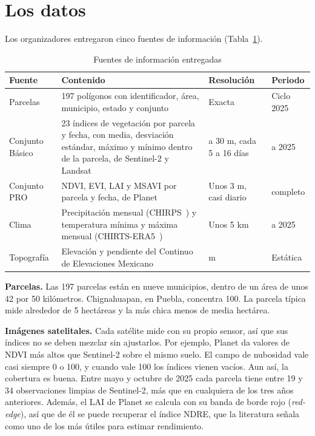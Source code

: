 \section{Los datos}\label{sec:datos}
Los organizadores entregaron cinco fuentes de información (Tabla~\ref{tab:fuentes}).

\begin{table}[!t]
\caption{Fuentes de información entregadas}\label{tab:fuentes}
\centering\footnotesize
\begin{tabularx}{\textwidth}{@{}>{\raggedright\arraybackslash}p{3.2cm}X>{\raggedright\arraybackslash}p{2.6cm}>{\raggedright\arraybackslash}p{2.4cm}@{}}
\toprule
Fuente & Contenido & Resolución & Periodo \\
\midrule
Parcelas & 197 polígonos con identificador, área, municipio, estado y conjunto & Exacta & Ciclo 2025 \\
Conjunto Básico & 23 índices de vegetación por parcela y fecha, con media, desviación estándar, máximo y mínimo dentro de la parcela, de Sentinel-2 y Landsat & 10 a 30 m, cada 5 a 16 días & 2022 a 2025 \\
Conjunto PRO & NDVI, EVI, LAI y MSAVI por parcela y fecha, de Planet & Unos 3 m, casi diario & 2025 completo \\
Clima & Precipitación mensual (CHIRPS~\cite{funk2015}) y temperatura mínima y máxima mensual (CHIRTS-ERA5~\cite{chirts}) & Unos 5 km & 2022 a 2025 \\
Topografía & Elevación y pendiente del Continuo de Elevaciones Mexicano~\cite{inegi} & 120 m & Estática \\
\bottomrule
\end{tabularx}
\end{table}

\textbf{Parcelas.} Las 197 parcelas están en nueve municipios, dentro de un área de unos 42 por 50 kilómetros.
Chignahuapan, en Puebla, concentra 100. La parcela típica mide alrededor de 5 hectáreas y la más chica menos de
media hectárea.

\textbf{Imágenes satelitales.} Cada satélite mide con su propio sensor, así que sus índices no se deben mezclar sin
ajustarlos. Por ejemplo, Planet da valores de NDVI más altos que Sentinel-2 sobre el mismo suelo. El campo de
nubosidad vale casi siempre 0 o 100, y cuando vale 100 los índices vienen vacíos. Aun así, la cobertura es buena.
Entre mayo y octubre de 2025 cada parcela tiene entre 19 y 34 observaciones limpias de Sentinel-2, más que en
cualquiera de los tres años anteriores. Además, el LAI de Planet se calcula con su banda de borde rojo
(\emph{red-edge}), así que de él se puede recuperar el índice NDRE, que la literatura señala como uno de los más
útiles para estimar rendimiento.

